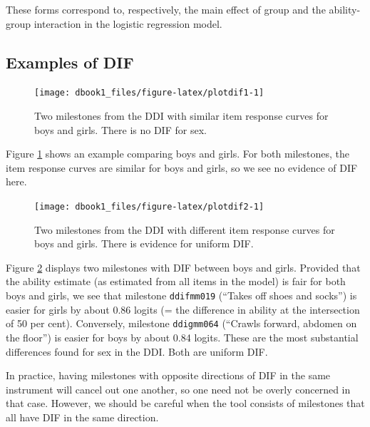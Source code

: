 \documentclass[
]{book}
\begin{document}
These forms correspond to, respectively, the main effect of group and the ability-group interaction in the logistic regression model.

\hypertarget{examples-of-dif}{%
\subsection{Examples of DIF}\label{examples-of-dif}}

\begin{figure}

{\centering \texttt{[image: dbook1\_files/figure-latex/plotdif1-1]} 

}

\caption{Two milestones from the DDI with similar item response curves for boys and girls. There is no DIF for sex.}\label{fig:plotdif1}
\end{figure}



Figure \ref{fig:plotdif1} shows an example comparing boys and girls. For both milestones, the item response curves are similar for boys and girls, so we see no evidence of DIF here.

\begin{figure}

{\centering \texttt{[image: dbook1\_files/figure-latex/plotdif2-1]} 

}

\caption{Two milestones from the DDI with different item response curves for boys and girls. There is evidence for uniform DIF.}\label{fig:plotdif2}
\end{figure}



Figure \ref{fig:plotdif2} displays two milestones with DIF between boys and girls. Provided that the ability estimate (as estimated from all items in the model) is fair for both boys and girls, we see that milestone \texttt{ddifmm019} (``Takes off shoes and socks'') is easier for girls by about 0.86 logits (= the difference in ability at the intersection of 50 per cent). Conversely, milestone \texttt{ddigmm064} (``Crawls forward, abdomen on the floor'') is easier for boys by about 0.84 logits. These are the most substantial differences found for sex in the DDI. Both are uniform DIF.

In practice, having milestones with opposite directions of DIF in the same instrument will cancel out one another, so one need not be overly concerned in that case. However, we should be careful when the tool consists of milestones that all have DIF in the same direction.
\end{document}
